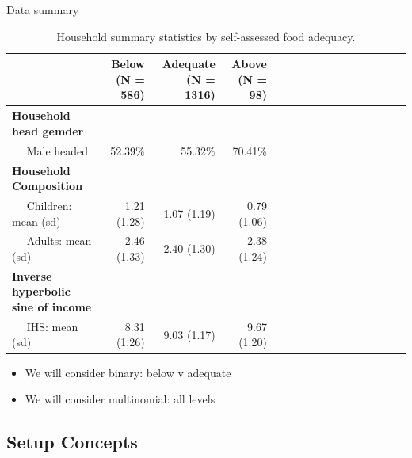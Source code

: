 \documentclass[
  ignorenonframetext,
]{beamer}
\providecommand{\tightlist}{%
  \setlength{\itemsep}{0pt}\setlength{\parskip}{0pt}}
\begin{document}
\begin{frame}{Data summary}
\protect{}\label{data-summary}
\tiny

\begin{table}

\caption{\label{tab:dstat}Household summary statistics by self-assessed food adequacy.}
\centering
\begin{tabular}[t]{l|rrrl|rrrl|rrrl|rrr}
\toprule
 & Below (N = 586) & Adequate (N = 1316) & Above (N = 98)\\
\midrule
\bf{Household head gemder} & ~ & ~ & ~\\
~~ Male headed & 52.39\% & 55.32\% & 70.41\%\\
\bf{Household Composition} & ~ & ~ & ~\\
~~ Children: mean (sd) & 1.21 (1.28) & 1.07 (1.19) & 0.79 (1.06)\\
~~ Adults: mean (sd) & 2.46 (1.33) & 2.40 (1.30) & 2.38 (1.24)\\
\bf{Inverse hyperbolic sine of income} & ~ & ~ & ~\\
~~ IHS: mean (sd) & 8.31 (1.26) & 9.03 (1.17) & 9.67 (1.20)\\
\bottomrule
\end{tabular}
\end{table}

\normalsize

\begin{itemize}
\tightlist
\item
  We will consider binary: below v adequate
\item
  We will consider multinomial: all levels
\end{itemize}
\end{frame}

\subsection{Setup Concepts}\label{setup-concepts}
\end{document}

